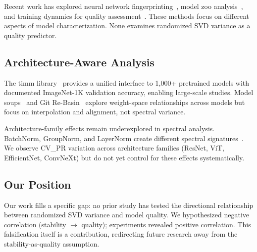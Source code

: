 Recent work has explored neural network fingerprinting~\cite{eilertsen2020classifying}, model zoo analysis~\cite{wortsman2022model}, and training dynamics for quality assessment~\cite{frankle2020linear}. These methods focus on different aspects of model characterization. None examines randomized SVD variance as a quality predictor.

\subsection{Architecture-Aware Analysis}

The timm library~\cite{wightman2019pytorch} provides a unified interface to 1,000+ pretrained models with documented ImageNet-1K validation accuracy, enabling large-scale studies. Model soups~\cite{wortsman2022model} and Git Re-Basin~\cite{ainsworth2023git} explore weight-space relationships across models but focus on interpolation and alignment, not spectral variance.

Architecture-family effects remain underexplored in spectral analysis. BatchNorm, GroupNorm, and LayerNorm create different spectral signatures~\cite{wu2018group}. We observe CV\_PR variation across architecture families (ResNet, ViT, EfficientNet, ConvNeXt) but do not yet control for these effects systematically.

\subsection{Our Position}

Our work fills a specific gap: no prior study has tested the directional relationship between randomized SVD variance and model quality. We hypothesized negative correlation (stability $\rightarrow$ quality); experiments revealed positive correlation. This falsification itself is a contribution, redirecting future research away from the stability-as-quality assumption.
